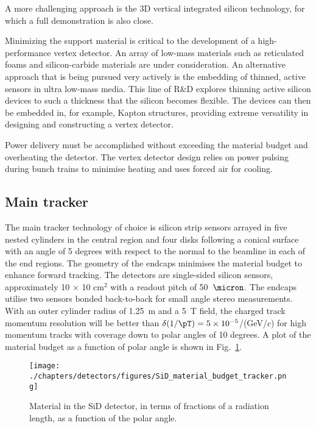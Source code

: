 A more challenging approach is the 3D vertical integrated silicon technology, for which a full 
demonstration is also close.




Minimizing the support material is critical to the development of a high-performance 
vertex detector. An array of 
low-mass materials such as reticulated foams and silicon-carbide
materials are under consideration. An alternative approach that is being pursued very actively is the
embedding of thinned, active sensors in ultra low-mass media. This line of R\&D
explores thinning active silicon devices to such a thickness that the silicon
becomes flexible. The devices can then be embedded in, for example, Kapton
structures, providing extreme versatility in designing and constructing a vertex
detector.

Power delivery must be accomplished without exceeding the material budget and
overheating the detector.  The vertex detector 
design relies on power pulsing during bunch trains to minimise heating 
and uses forced air for cooling. 

\subsection{Main tracker}
The main tracker technology of
choice is silicon strip sensors arrayed in five nested cylinders in the central
region and four disks following a conical surface with an angle of 5 degrees
with respect to the normal to the beamline in each of the end regions. The geometry of the endcaps
minimises the material budget to enhance forward tracking. The detectors are
single-sided silicon sensors, approximately 10 $\times$ 10 cm$^2$ with a readout
pitch of 50~$\micron$. The endcaps utilise two sensors bonded back-to-back for
small angle stereo measurements. With an outer cylinder radius of 1.25~m
and a 5~T field, the charged track momentum resolution will be better than
$\delta (1/\pT) = 5 \times 10^{-5} $/(GeV/$c$) for high momentum tracks with coverage down to polar angles of 10 degrees.
A plot of the material budget as a function of polar angle is shown in Fig.~\ref{fig:sid_mat_budget}.

\begin{figure}
\begin{center}
\texttt{[image: ./chapters/detectors/figures/SiD\_material\_budget\_tracker.png]}
\end{center}
\caption{Material in the SiD detector, in terms of fractions of a radiation length, as a function of the polar angle.}
\label{fig:sid_mat_budget}
\end{figure}



